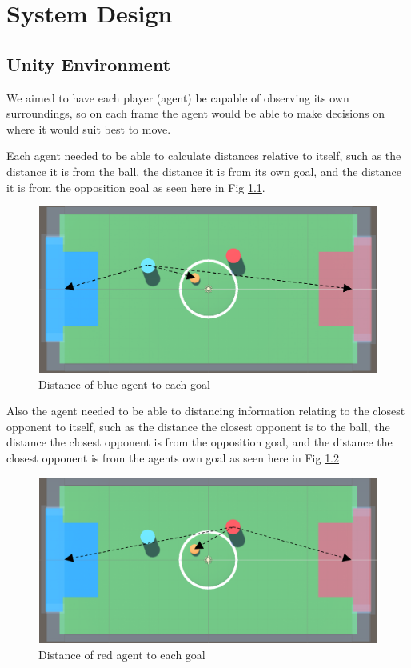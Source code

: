 
\chapter{System Design}

\section{Unity Environment}

\begin{flushleft}
We aimed to have each player (agent) be capable of observing its own surroundings, so on each frame the agent would be able to make decisions on where it would suit best to move.\par
Each agent needed to be able to calculate distances relative to itself, such as the distance it is from the ball, the distance it is from its own goal, and the distance it is from the opposition goal as seen here in Fig \ref{fig:sd1}.
\end{flushleft}

\begin{figure}[H]
    \centering
    \includegraphics[width=115mm, height=55mm]{img/Image1.png}
    \caption{Distance of blue agent to each goal}
    \label{fig:sd1}
\end{figure}

\begin{flushleft}
Also the agent needed to be able to distancing information relating to the closest opponent to itself, such as the distance the closest opponent is to the ball, the distance the closest opponent is from the opposition goal, and the distance the closest opponent is from the agents own goal as seen here in Fig \ref{fig:sd2}
\end{flushleft}

\begin{figure}[H]
    \centering
    \includegraphics[width=115mm, height=55mm]{img/Image2.png}
    \caption{Distance of red agent to each goal}
    \label{fig:sd2}
\end{figure}

